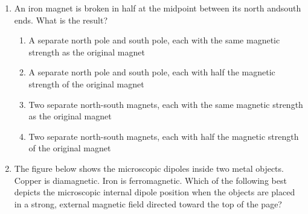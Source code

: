 \documentclass{../../../oss-classkick}
\begin{document}
\begin{multicols*}{2}
\begin{enumerate}[leftmargin=18pt]
  \item An iron magnet is broken in half at the midpoint between its north
    andsouth ends. What is the result?
    \begin{enumerate}[nosep,leftmargin=18pt,label=(\Alph*)]
    \item A separate north pole and south pole, each with the same
      magnetic strength as the original magnet
    \item A separate north pole and south pole, each with half the magnetic
      strength of the original magnet 
    \item Two separate north-south magnets, each with the same magnetic
      strength as the original magnet
    \item Two separate north-south magnets, each with half the magnetic
      strength of the original magnet
    \end{enumerate}
    \vspace{.7in}
    \columnbreak

  \item The figure below shows the microscopic dipoles inside two metal objects.
    Copper is diamagnetic. Iron is ferromagnetic. Which of the following
    best depicts the microscopic internal dipole position when the objects
    are placed in a strong, external magnetic field directed toward the top
    of the page?
    \begin{center}

    \end{center}
    \vspace{.7in}
    

\end{enumerate}
\end{multicols*}
\end{document}
